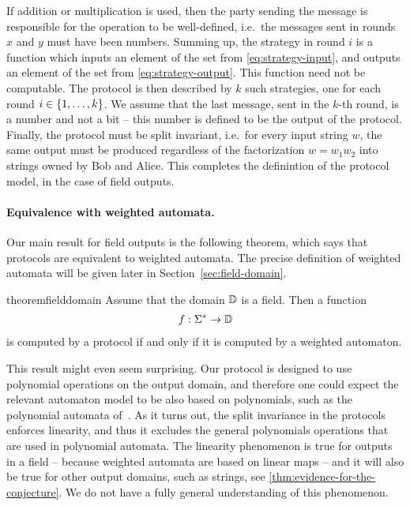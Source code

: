 If addition or multiplication is used, then the party sending the message is responsible for the operation to be well-defined, i.e.~the messages sent in rounds $x$ and $y$ must have been numbers.
Summing up, the strategy in round $i$ is a function which inputs an element of the set from \eqref{eq:strategy-input}, and outputs an element of the set from \eqref{eq:strategy-output}. This function need not be computable. The protocol is then described by $k$ such strategies, one for each round $i \in \{1,\ldots,k\}$. We assume that the last message, sent in the $k$-th round, is a number and not a bit -- this number is defined to be the output of the protocol. 
Finally, the protocol must be split invariant, i.e.~for every input string $w$, the same output must be produced regardless of the factorization $w = w_1 w_2$ into strings owned by Bob and Alice. This completes the definintion of the protocol model, in the case of field outputs.


\paragraph*{Equivalence with weighted automata.} Our main result for field outputs is the following theorem, which says that protocols are equivalent to weighted automata. The precise definition of weighted automata will be given later in Section~\ref{sec:field-domain}.



\begin{restatable}{theorem}{fielddomain}
    \label{thm:field-domain}
     Assume that the domain $\mathbb D$ is a field. Then a function 
    \begin{align*}
    f : \Sigma^* \to \mathbb D
    \end{align*}  is computed by a protocol if and only if it is  computed by a weighted automaton.
\end{restatable}



  This result might even seem surprising. Our protocol is designed to use polynomial operations on the output domain, and therefore one could expect the relevant automaton model to be also based on polynomials, such as the  polynomial automata of~\cite{DBLP:conf/lics/BenediktDSW17}. As it turns out, the split invariance in the protocols  enforces linearity, and thus it excludes the general polynomials operations that are used in polynomial automata. The linearity phenomenon is true for outputs in a field -- because weighted automata are based on linear maps -- and it will also be true for other output domains, such as strings, see \cref{thm:evidence-for-the-conjecture}. We do not have a fully general understanding of this phenomenon.

